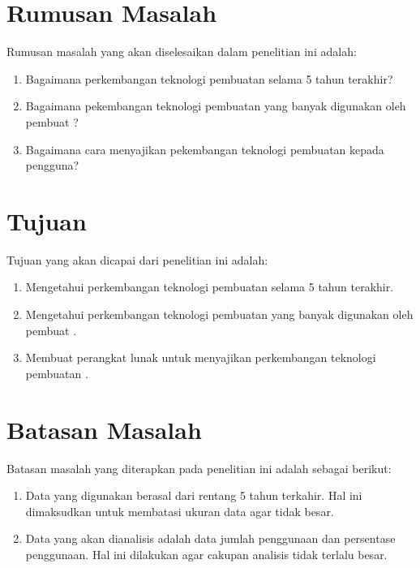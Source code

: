 \section{Rumusan Masalah}
	Rumusan masalah yang akan diselesaikan dalam penelitian ini adalah:
    \begin{enumerate}
        \item Bagaimana perkembangan teknologi pembuatan \web selama 5 tahun terakhir?
        \item Bagaimana pekembangan teknologi pembuatan \web yang banyak digunakan oleh pembuat \web?
        \item Bagaimana cara menyajikan pekembangan teknologi pembuatan \web kepada pengguna?
    \end{enumerate}
	
\section{Tujuan}
	Tujuan yang akan dicapai dari penelitian ini adalah:
    \begin{enumerate}
        \item Mengetahui perkembangan teknologi pembuatan \web selama 5 tahun terakhir.
        \item Mengetahui perkembangan teknologi pembuatan \web yang banyak digunakan oleh pembuat \web.
        \item Membuat perangkat lunak untuk menyajikan perkembangan teknologi pembuatan \web.
    \end{enumerate}
\section{Batasan Masalah}
\label{sec:batasan}
Batasan masalah yang diterapkan pada penelitian ini adalah sebagai berikut:
\begin{enumerate}
    \item Data yang digunakan berasal dari rentang 5 tahun terkahir. Hal ini dimaksudkan untuk membatasi ukuran data agar tidak besar.
    \item Data yang akan dianalisis adalah data jumlah penggunaan dan persentase penggunaan. Hal ini dilakukan agar cakupan analisis tidak terlalu besar.
\end{enumerate}

